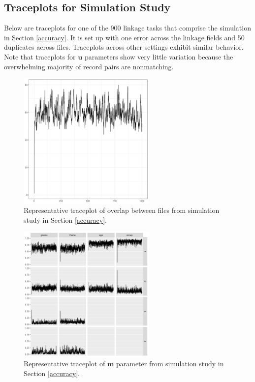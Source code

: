 \documentclass[ba]{imsart}
\begin{document}
	
	\hypertarget{appendix-sim}{%
		\subsection{Traceplots for Simulation Study}\label{app:appendix-sim}}
	Below are traceplots for one of the 900 linkage tasks that comprise the simulation in Section \ref{accuracy}. It is set up with one error across the linkage fields and 50 duplicates across files. Traceplots across other settings exhibit similar behavior. Note that traceplots for $\bm{u}$ parameters show very little variation because the overwhelming majority of record pairs are nonmatching.  
	
	\begin{figure}[!h]
		\begin{center}
			\includegraphics[width=0.6\textwidth]{../notes/figures/sim_overlap_trace} 
			\caption{Representative traceplot of overlap between files from simulation study in Section \ref{accuracy}.}\label{fig:sim_overlap_trace}
		\end{center}
	\end{figure}
	
	
	\begin{figure}[!h]
		\begin{center}
			\includegraphics[width=0.6\textwidth]{../notes/figures/sim_m_trace} 
			\caption{Representative traceplot of $\bm{m}$ parameter from simulation study in Section \ref{accuracy}.}\label{fig:sim_m_trace}
		\end{center}
	\end{figure}
	
\end{document}

